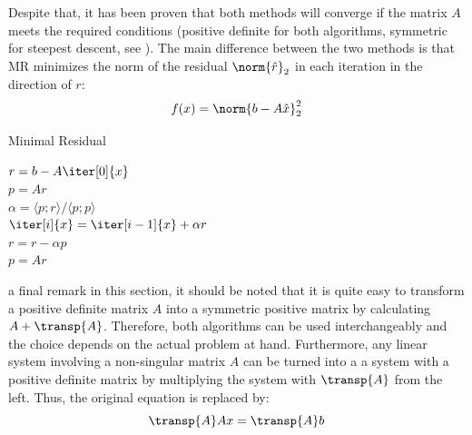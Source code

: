 Despite that, it has been proven that both methods will converge if the matrix $A$ meets the required conditions (positive definite for both algorithms, symmetric for steepest descent, see \cite{saad_iterative_2003}). The main difference between the two methods is that MR minimizes the norm of the residual $\norm{\hat{r}}_2$ in each iteration in the direction of $r$:
\begin{equation}
    f(x) = \norm{b-A\hat{x}}_2^2    
\end{equation}


\begin{algorithm}[h]
  \caption{Minimal Residual}
  \label{alg:mr}
  \SetAlgoLined
  \DontPrintSemicolon
  $r = b-A\iter[0]{x}$ \\
  $p = Ar$ \\
   {
    $\alpha = \langle p;r \rangle / \langle p;p \rangle$ \\
    $\iter[i]{x} = \iter[i-1]{x}+\alpha r$ \\
    $r = r - \alpha p$ \\
    $p = Ar$ \\
  }
\end{algorithm}

\noindentAs a final remark in this section, it should be noted that it is quite easy to transform a positive definite matrix $A$ into a symmetric positive matrix by calculating $A+\transp{A}$. Therefore, both algorithms can be used interchangeably and the choice depends on the actual problem at hand. Furthermore, any linear system involving a non-singular matrix $A$ can be turned into a a system with a positive definite matrix by multiplying the system with $\transp{A}$ from the left. Thus, the original equation is replaced by:
\begin{equation}
    \transp{A}Ax = \transp{A}b
\end{equation}

